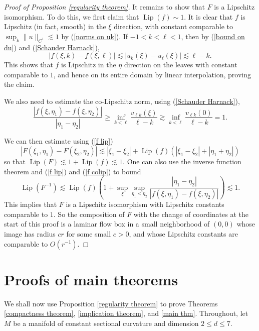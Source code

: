 \documentclass[final,12pt, leqno]{brownthesis}
\DeclareMathOperator{\Lip}{Lip}
\theoremstyle{definition}
\numberwithin{equation}{section}
\begin{document}
\begin{proof}[Proof of Proposition \ref{regularity theorem}]
It remains to show that $F$ is a Lipschitz isomorphism.
To do this, we first claim that $\Lip(f) \sim 1$.
It is clear that $f$ is Lipschitz (in fact, smooth) in the $\xi$ direction, with constant comparable to $\sup_k \|u\|_{C^1} \lesssim 1$ by (\ref{norms on uk}).
If $-1 < k < \ell < 1$, then by (\ref{bound on du}) and (\ref{Schauder Harnack}),
\begin{equation}\label{f lip}
	|f(\xi, k) - f(\xi, \ell)| \lesssim |u_k(\xi) - u_\ell(\xi)| \lesssim \ell - k.
\end{equation}
This shows that $f$ is Lipschitz in the $\eta$ direction on the leaves with constant comparable to $1$, and hence on its entire domain by linear interpolation, proving the claim.

We also need to estimate the co-Lipschitz norm, using (\ref{Schauder Harnack}),
\begin{equation}\label{f colip}
	\frac{|f(\xi, \eta_1) - f(\xi, \eta_2)|}{|\eta_1 - \eta_2|} \geq \inf_{k < \ell} \frac{v_{\ell k}(\xi)}{\ell - k} \gtrsim \inf_{k < \ell} \frac{v_{\ell k}(0)}{\ell - k} = 1.
\end{equation}

We can then estimate using (\ref{f lip})
$$|F(\xi_1, \eta_1) - F(\xi_2, \eta_2)| \lesssim |\xi_1 - \xi_2| + \Lip(f)(|\xi_1 - \xi_2| + |\eta_1 + \eta_2|)$$
so that $\Lip(F) \lesssim 1 + \Lip(f) \lesssim 1$.
One can also use the inverse function theorem and (\ref{f lip}) and (\ref{f colip}) to bound 
$$\Lip(F^{-1}) \lesssim \Lip(f)\left(1 + \sup_\xi \sup_{\eta_1 < \eta_2} \frac{|\eta_1 - \eta_2|}{|f(\xi, \eta_1) - f(\xi, \eta_2)|}\right) \lesssim 1.$$
This implies that $F$ is a Lipschitz isomorphism with Lipschitz constants comparable to $1$.
So the composition of $F$ with the change of coordinates at the start of this proof is a laminar flow box in a small neighborhood of $(0, 0)$ whose image has radius $cr$ for some small $c > 0$, and whose Lipschitz constants are comparable to $O(r^{-1})$.
\end{proof}

\section{Proofs of main theorems}\label{CompactnessSec}
We shall now use Proposition \ref{regularity theorem} to prove Theorems \ref{compactness theorem}, \ref{implication theorem}, and \ref{main thm}.
Throughout, let $M$ be a manifold of constant sectional curvature and dimension $2 \leq d \leq 7$.
\end{document}

